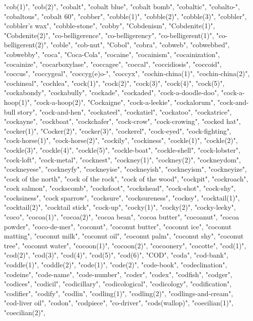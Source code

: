 "cob(1)",
"cob(2)",
"cobalt",
"cobalt blue",
"cobalt bomb",
"cobaltic",
"cobalto-",
"cobaltous",
"cobalt 60",
"cobber",
"cobble(1)",
"cobble(2)",
"cobble(3)",
"cobbler",
"cobbler's wax",
"cobble-stone",
"cobby",
"Cobdenism",
"Cobdenite(1)",
"Cobdenite(2)",
"co-belligerence",
"co-belligerency",
"co-belligerent(1)",
"co-belligerent(2)",
"coble",
"cob-nut",
"Cobol",
"cobra",
"cobweb",
"cobwebbed",
"cobwebby",
"coca",
"Coca-Cola",
"cocaine",
"cocainism",
"cocainization",
"cocainize",
"cocarboxylase",
"coccagee",
"coccal",
"coccidiosis",
"coccoid",
"coccus",
"coccygeal",
"coccyg(e)o-",
"coccyx",
"cochin-china(1)",
"cochin-china(2)",
"cochineal",
"cochlea",
"cock(1)",
"cock(2)",
"cock(3)",
"cock(4)",
"cock(5)",
"cockabondy",
"cockabully",
"cockade",
"cockaded",
"cock-a-doodle-doo",
"cock-a-hoop(1)",
"cock-a-hoop(2)",
"Cockaigne",
"cock-a-leekie",
"cockalorum",
"cock-and-bull story",
"cock-and-hen",
"cockateel",
"cockatiel",
"cockatoo",
"cockatrice",
"cockayne",
"cockboat",
"cockchafer",
"cock-crow",
"cock-crowing",
"cocked hat",
"cocker(1)",
"Cocker(2)",
"cocker(3)",
"cockerel",
"cock-eyed",
"cock-fighting",
"cock-horse(1)",
"cock-horse(2)",
"cockily",
"cockiness",
"cockle(1)",
"cockle(2)",
"cockle(3)",
"cockle(4)",
"cockle(5)",
"cockle-boat",
"cockle-shell",
"cock-lobster",
"cock-loft",
"cock-metal",
"cocknest",
"cockney(1)",
"cockney(2)",
"cockneydom",
"cockneyese",
"cockneyfy",
"cockneyise",
"cockneyish",
"cockneyism",
"cockneyize",
"cock of the north",
"cock of the rock",
"cock of the wood",
"cockpit",
"cockroach",
"cock salmon",
"cockscomb",
"cocksfoot",
"cockshead",
"cock-shot",
"cock-shy",
"cocksiness",
"cock sparrow",
"cocksure",
"cocksureness",
"cocksy",
"cocktail(1)",
"cocktail(2)",
"cocktail stick",
"cock-up",
"cocky(1)",
"cocky(2)",
"cocky-leeky",
"coco",
"cocoa(1)",
"cocoa(2)",
"cocoa bean",
"cocoa butter",
"cocoanut",
"cocoa powder",
"coco-de-mer",
"coconut",
"coconut butter",
"coconut ice",
"coconut matting",
"coconut milk",
"coconut oil",
"coconut palm",
"coconut shy",
"coconut tree",
"coconut water",
"cocoon(1)",
"cocoon(2)",
"cocoonery",
"cocotte",
"cod(1)",
"cod(2)",
"cod(3)",
"cod(4)",
"cod(5)",
"cod(6)",
"COD",
"coda",
"cod-bank",
"coddle(1)",
"coddle(2)",
"code(1)",
"code(2)",
"code-book",
"codeclination",
"codeine",
"code-name",
"code-number",
"coder",
"codex",
"codfish",
"codger",
"codices",
"codicil",
"codicillary",
"codicological",
"codicology",
"codification",
"codifier",
"codify",
"codlin",
"codling(1)",
"codling(2)",
"codlings-and-cream",
"cod-liver oil",
"codon",
"codpiece",
"co-driver",
"cods(wallop)",
"coecilian(1)",
"coecilian(2)",
